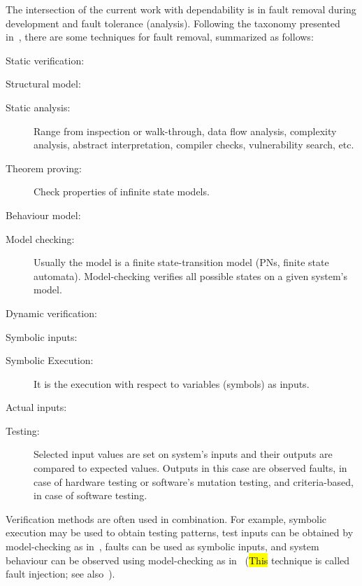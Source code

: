 \documentclass[12pt,openright,twoside,a4paper,oldfontcommands,english,brazil,draft]{abntex2}
\theoremstyle{theo}
\begin{document}
The intersection of the current work with dependability is in fault removal during development and fault tolerance (analysis).
Following the taxonomy presented in~\cite{ALR+2004}, there are some techniques for fault removal, summarized as follows:
\begin{alineas}
  \item Static verification:
  \begin{subalineas}
    \item Structural model:
    \begin{description}
      \item[Static analysis:] Range from inspection or walk-through, data flow analysis, complexity analysis, abstract interpretation, compiler checks, vulnerability search, etc.
      \item[Theorem proving:] Check properties of infinite state models.
    \end{description}
    \item Behaviour model:
    \begin{description}
      \item[Model checking:] Usually the model is a finite state-transition model (\acp{PN}, finite state automata).
      Model-checking verifies all possible states on a given system's model.
    \end{description}
  \end{subalineas}
  \item Dynamic verification:
  \begin{subalineas}
    \item Symbolic inputs:
    \begin{description}
      \item[Symbolic Execution:] It is the execution with respect to variables (symbols) as inputs.
    \end{description}
    \item Actual inputs:
    \begin{description}
      \item[Testing:] Selected input values are set on system's inputs and their outputs are compared to expected values.
      Outputs in this case are observed faults, in case of hardware testing or software's mutation testing, and criteria-based, in case of software testing.
    \end{description}
  \end{subalineas}
\end{alineas}


Verification methods are often used in combination.
For example, symbolic execution may be used to obtain testing patterns, test inputs can be obtained by model-checking as in~\cite{CBC+2015}, faults can be used as symbolic inputs, and system behaviour can be observed using model-checking as in~\cite{DM2012,Didier2012} (\hl{This} technique is called fault injection; see also~\cite{AAL+1996}).
\end{document}

